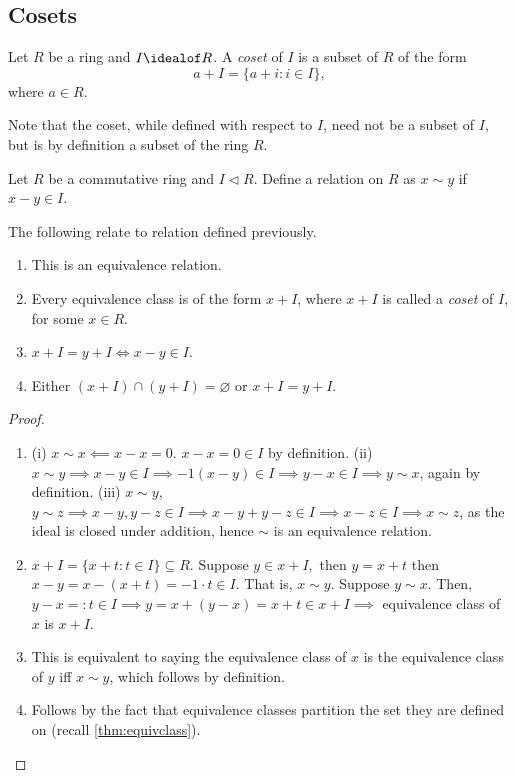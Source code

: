 \documentclass[12pt,oneside]{article}
\begin{document}
\subsection{Cosets}
\begin{definition}[Coset]
  Let $R$ be a ring and $I \idealof R$. A \emph{coset} of $I$ is a subset of $R$ of the form \[a + I = \{a + i : i \in I\},\] where $a \in R$.
\end{definition}
\begin{remark}
  Note that the coset, while defined with respect to $I$, need not be a subset of $I$, but is by definition a subset of the ring $R$.
\end{remark}

\begin{definition}
  Let $R$ be a commutative ring and $I \triangleleft R$. Define a relation on $R$ as $x \sim y$ if $x -y \in I$.
\end{definition}

\begin{lemma}
  The following relate to relation defined previously.
  \begin{enumerate}
    \item This is an equivalence relation.
    \item Every equivalence class is of the form $x + I$, where $x+I$ is called a \emph{coset} of $I$, for some $x \in R$.
    \item $x + I = y + I \iff x - y \in I$.
    \item Either $(x+I) \cap (y+I) = \varnothing$ or $x + I = y + I$.
  \end{enumerate}
\end{lemma}

\begin{proof}
  \begin{enumerate}
    \item (i) $x \sim x \impliedby x - x = 0$. $x - x = 0 \in I$ by definition. (ii) $x \sim y \implies x - y \in I \implies -1 (x-y) \in I \implies y-x \in I \implies y \sim x$, again by definition. (iii) $x \sim y$, $y \sim z \implies x -y, y - z \in I \implies x - y +  y - z \in I \implies x -z \in I \implies x \sim z$, as the ideal is closed under addition, hence $\sim$ is an equivalence relation.
    \item $x + I = \{x + t : t \in I\} \subseteq R$. Suppose $y \in x + I,$ then $y = x + t$ then $x - y = x - (x+t) = -1\cdot t \in I$. That is, $x \sim y$. Suppose $y \sim x$. Then, $y - x =: t \in I \implies y = x + (y-x) = x + t \in x+ I \implies $ equivalence class of $x$ is $x + I$.
    \item This is equivalent to saying the equivalence class of $x$ is the equivalence class of $y$ iff $x \sim y$, which follows by definition.
    \item Follows by the fact that equivalence classes partition the set they are defined on (recall \cref{thm:equivclass}).
  \end{enumerate}
\end{proof}
\end{document}
